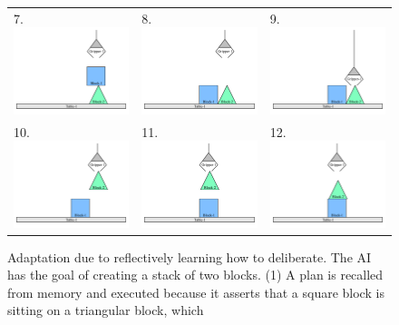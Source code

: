 \begin{figure}
\begin{tabular}{p{3.5cm}p{3.5cm}p{3.5cm}}
7. \includegraphics[width=3.5cm]{gfx/blocks_world_example-7}  & 8. \includegraphics[width=3.5cm]{gfx/blocks_world_example-8}  & 9. \includegraphics[width=3.5cm]{gfx/blocks_world_example-9} \\
10. \includegraphics[width=3.5cm]{gfx/blocks_world_example-10} & 11. \includegraphics[width=3.5cm]{gfx/blocks_world_example-11} & 12. \includegraphics[width=3.5cm]{gfx/blocks_world_example-12}
\end{tabular}
\caption[Adaptation due to reflectively learning how to
  deliberate.]{Adaptation due to reflectively learning how to
  deliberate.  The AI has the goal of creating a stack of two blocks.
  (1) A plan is recalled from memory and executed because it asserts
  that a square block is sitting on a triangular block, which
}
\end{figure}
